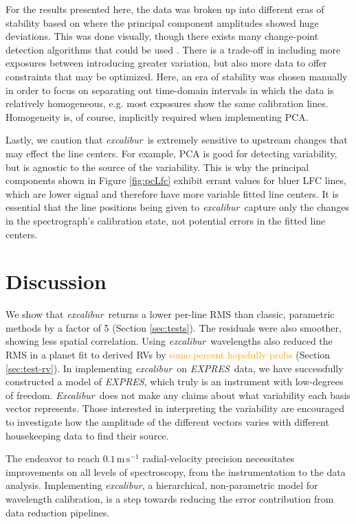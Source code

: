 \documentclass[modern]{aastex63}
\newcommand{\project}[1]{\textsl{#1}}
\newcommand{\name}{\project{excalibur}}
\newcommand{\Name}{\project{Excalibur}}
\newcommand{\acronym}[1]{{\small{#1}}}
\newcommand{\expres}{\project{\acronym{EXPRES}}}
\newcommand{\lz}[1]{\textcolor{orange}{#1}}
\newcommand{\mps}{\mathrm{m\,s^{-1}}}
\begin{document}
For the results presented here, the data was broken up into different eras of stability based on where the principal component amplitudes showed huge deviations.  This was done visually, though there exists many change-point detection algorithms that could be used \citep{aminikhanghahi2017}.  There is a trade-off in including more exposures between introducing greater variation, but also more data to offer constraints that may be optimized.  Here, an era of stability was chosen  manually in order to focus on separating out time-domain intervals in which the data is relatively homogeneous, e.g. most exposures show the same calibration lines.  Homogeneity is, of course, implicitly required when implementing PCA.

Lastly, we caution that \name\ is extremely sensitive to upstream changes that may effect the line centers.  For example, PCA is good for detecting variability, but is agnostic to the source of the variability.  This is why the principal components shown in Figure \ref{fig:pcLfc} exhibit errant values for bluer LFC lines, which are lower signal and therefore have more variable fitted line centers.  It is essential that the line positions being given to \name\ capture only the changes in the spectrograph's calibration state, not potential errors in the fitted line centers. 


\section{Discussion} \label{sec:discussion}
We show that \name\ returns a lower per-line RMS than classic, parametric methods by a factor of 5 (Section \ref{sec:tests}).  The residuals were also smoother, showing less spatial correlation.  Using \name\ wavelengths also reduced the RMS in a planet fit to derived RVs by \lz{some percent hopefully probs} (Section \ref{sec:test-rv}).  In implementing \name\ on \expres\ data, we have successfully constructed a model of \expres, which truly is an instrument with low-degrees of freedom.  \Name\ does not make any claims about what variability each basis vector represents.  Those interested in interpreting the variability are encouraged to investigate how the amplitude of the different vectors varies with different housekeeping data to find their source.

The endeavor to reach $0.1\,\mps$ radial-velocity precision necessitates improvements on all levels of spectroscopy, from the instrumentation to the data analysis.  Implementing \name, a hierarchical, non-parametric model for wavelength calibration, is a step towards reducing the error contribution from data reduction pipelines.
\end{document}
